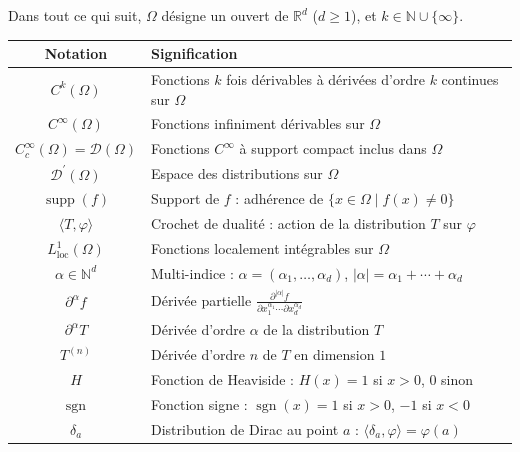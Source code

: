\documentclass[12pt,a4paper,openany]{book}
\theoremstyle{definition}
\theoremstyle{plain}
\theoremstyle{remark}
\begin{document}
	Dans tout ce qui suit, $\Omega$ désigne un ouvert de $\mathbb{R}^d$ ($d \ge 1$), et $k \in \mathbb{N} \cup \{\infty\}$.
	\begin{center}
		\renewcommand{\arraystretch}{1.4}
		\begin{tabular}{@{}cl@{}}
			\toprule
			\textbf{Notation} & \textbf{Signification} \\
			\midrule
			$C^{k}(\Omega)$ & Fonctions $k$ fois dérivables à dérivées d'ordre $k$ continues sur $\Omega$ \\
			$C^{\infty}(\Omega)$ & Fonctions infiniment dérivables sur $\Omega$ \\
			$C_{c}^{\infty}(\Omega)=\mathcal{D}(\Omega)$ & Fonctions $C^{\infty}$ à support compact inclus dans $\Omega$ \\
			$\mathcal{D}^{\prime}(\Omega)$ & Espace des distributions sur $\Omega$ \\
			$\operatorname{supp}(f)$ & Support de $f$ : adhérence de $\{x \in \Omega \mid f(x) \neq 0\}$ \\
			$\langle T, \varphi\rangle$ & Crochet de dualité : action de la distribution $T$ sur $\varphi$ \\
			$L_{\text{loc}}^{1}(\Omega)$ & Fonctions localement intégrables sur $\Omega$ \\
			$\alpha \in \mathbb{N}^{d}$ & Multi-indice : $\alpha = (\alpha_1, \dots, \alpha_d)$, $|\alpha| = \alpha_1 + \cdots + \alpha_d$ \\
			$\partial^{\alpha}f$ & Dérivée partielle $\frac{\partial^{|\alpha|}f}{\partial x_1^{\alpha_1} \cdots \partial x_d^{\alpha_d}}$ \\
			$\partial^{\alpha}T$ & Dérivée d'ordre $\alpha$ de la distribution $T$ \\
			$T^{(n)}$ & Dérivée d'ordre $n$ de $T$ en dimension $1$ \\
			$H$ & Fonction de Heaviside : $H(x) = 1$ si $x > 0$, $0$ sinon \\
			$\operatorname{sgn}$ & Fonction signe : $\operatorname{sgn}(x) = 1$ si $x > 0$, $-1$ si $x < 0$ \\
			$\delta_{a}$ & Distribution de Dirac au point $a$ : $\langle \delta_{a}, \varphi \rangle = \varphi(a)$ \\
			\bottomrule
		\end{tabular}
	\end{center}
	
	
	
	
	
	
	
\end{document}
